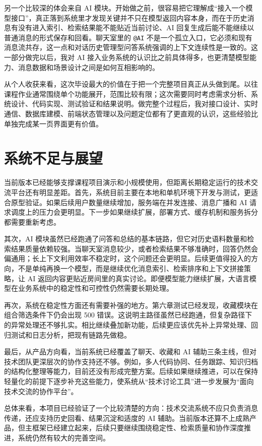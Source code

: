 另一个比较深的体会来自 AI 模块。开始做之前，很容易把它理解成“接入一个模型接口”，真正落到系统里才发现关键并不只在模型返回内容本身，而在于历史消息有没有进入索引、检索结果能不能贴近当前讨论、AI 回复生成后能不能继续以普通消息的形式保存和回看。聊天室里的 \texttt{@AI} 不是一个孤立入口，它必须和现有消息流共存，这一点和对话历史管理型问答系统强调的上下文连续性是一致的\cite{historyragqa2026}。这一部分做完以后，我对 AI 接入业务系统的认识比之前具体得多，也更清楚模型能力、消息数据和场景设计之间是如何互相影响的。

从个人收获来看，这次毕设最大的价值在于把一个完整项目真正从头做到尾。以往课程作业通常围绕单个功能展开，范围比较有限；这次需要同时考虑需求分析、系统设计、代码实现、测试验证和结果说明。做完整个过程后，我对接口设计、实时通信、数据库建模、前端状态管理以及问题定位都有了更直观的认识，这些经验比单独完成某一页界面更有价值。

\section{系统不足与展望}

当前版本已经能够支撑课程项目演示和小规模使用，但距离长期稳定运行的技术交流平台还有明显差距。首先，系统目前主要在本地和单机环境下开发与测试，更适合原型验证。如果后续用户数量继续增加，服务端在并发连接、消息广播和 AI 请求调度上的压力会更明显。下一步如果继续扩展，部署方式、缓存机制和服务拆分都需要重新考虑。

其次，AI 模块虽然已经跑通了问答和总结的基本链路，但它对历史语料数量和检索结果质量依赖较强。当聊天室消息较少，或者检索结果不够准确时，回答仍然会偏通用；长上下文利用效率不稳定时，这个问题还会更明显\cite{longcontext2024}。后续更值得投入的方向，不是单纯再换一个模型，而是继续优化消息索引、检索排序和上下文拼接策略，让 AI 返回内容更贴近房间里的真实讨论\cite{ragllmsurvey2024}。即便模型能力继续扩展，大语言模型在业务系统中的稳定性和可控性仍然需要长期处理\cite{llmsurvey2023}。

再次，系统在稳定性方面还有需要补强的地方。第六章测试已经发现，收藏模块在组合筛选条件下仍会出现 500 错误。这说明主路径虽然已经跑通，但复杂路径下的异常处理还不够扎实。相比继续叠加新功能，后续更应该优先补上异常处理、回归测试和日志分析，把现有链路先做稳。

最后，从产品方向看，当前系统已经覆盖了聊天、收藏和 AI 辅助三条主线，但对技术团队更深层次的协作支持还不够。例如，多人代码协同、任务跟踪、知识归档的结构化整理等能力，目前还没有形成完整方案。后续如果继续推进，可以在保持轻量化的前提下逐步补充这些能力，使系统从“技术讨论工具”进一步发展为“面向技术交流的协作平台”。

总体来看，本项目已经验证了一个比较清楚的方向：技术交流系统不应只负责消息传递，还应支持历史回看、结果沉淀和适度的 AI 辅助。当前版本还算不上成熟产品，但主框架已经建立起来，后续只要继续围绕稳定性、检索质量和协作深度推进，系统仍然有较大的完善空间。
